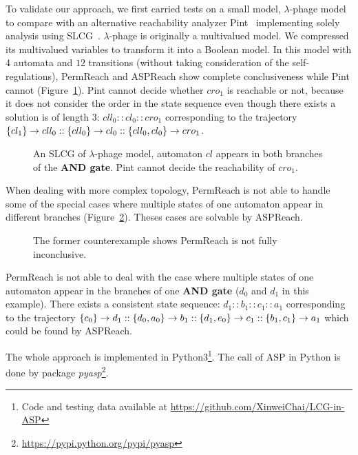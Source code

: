 To validate our approach, we first carried tests on a small model, $\lambda$-phage model~\cite{thieffry1995dynamical} to compare with an alternative reachability analyzer Pint~\cite{pauleve2012} implementing solely analysis using SLCG~\cite{pauleve2017reduction,folschette2015,pauleve2011}.
$\lambda$-phage is originally a multivalued model.
We compressed its multivalued variables to transform it into a Boolean model.
In this model with 4 automata and $12$ transitions (without taking consideration of the self-regulations),
PermReach and ASPReach show complete conclusiveness while Pint cannot (Figure~\ref{fig:LCG_lambdaPhage}). %
Pint cannot decide whether $cro_1$ is reachable or not, because it does not consider the order in the state sequence even though there exists a solution is of length 3: $cll_0::cl_0::cro_1$ corresponding to the trajectory $\acm{cl_1}{cll_1}{cll_0}::\acm{cll_0}{cl_1}{cl_0}::\acm{cll_0,cl_0}{cro_0}{cro_1}$.
\begin{figure}[ht]
\centering
    
    \caption[SLCG of $\lambda$-phage model]{An SLCG of $\lambda$-phage model, automaton $cl$ appears in both branches of the \textbf{AND gate}.
    Pint cannot decide the reachability of $cro_1$.}
    \label{fig:LCG_lambdaPhage}
\end{figure}

When dealing with more complex topology, PermReach is not able to handle some of the special cases where multiple states of one automaton appear in different branches (Figure~\ref{fig:countexPerm}).
Theses cases are solvable by ASPReach.

\begin{figure}[ht]
    \centering
    
    \caption[Counterexample of PermReach]{The former counterexample shows PermReach is not fully inconclusive.}\label{fig:countexPerm}
\end{figure}

PermReach is not able to deal with the case where multiple states of one automaton appear in the branches of one \textbf{AND gate} ($d_0$ and $d_1$ in this example).
There exists a consistent state sequence: $d_1::b_1::c_1::a_1$ corresponding to the trajectory $\acm{c_0}{d_0}{d_1}::\acm{d_0,a_0}{b_0}{b_1}::\acm{d_1,e_0}{c_0}{c_1}::\acm{b_1,c_1}{a_0}{a_1}$ which could be found by ASPReach.

The whole approach is implemented in Python3\footnote{Code and testing data available at \url{https://github.com/XinweiChai/LCG-in-ASP}}.
The call of ASP in Python is done by package \textit{pyasp}\footnote{\url{https://pypi.python.org/pypi/pyasp}}. 

